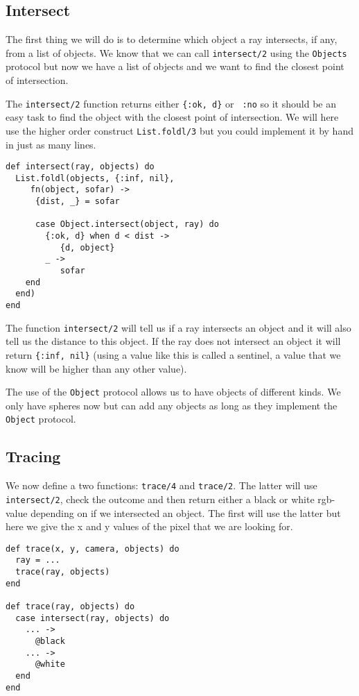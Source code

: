 \documentclass[a4paper,11pt]{article}
\begin{document}
\subsection*{Intersect}

The first thing we will do is to determine which object a ray
intersects, if any, from a list of objects. We know that we can call
{\tt intersect/2} using the {\tt Objects} protocol but now we have a list
of objects and we want to find the closest point of intersection.

The {\tt intersect/2} function returns either {\tt \{:ok, d\}} or {\tt
  :no} so it should be an easy task to find the object with the closest
point of intersection. We will here use the higher order construct
{\tt List.foldl/3} but you could implement it by hand in just as many lines.

\begin{verbatim}
def intersect(ray, objects) do
  List.foldl(objects, {:inf, nil},
     fn(object, sofar) ->
      {dist, _} = sofar

      case Object.intersect(object, ray) do
        {:ok, d} when d < dist ->
           {d, object}
        _ ->
           sofar
    end
  end)
end
\end{verbatim}

The function {\tt intersect/2} will tell us if a ray intersects an
object and it will also tell us the distance to this object. If the
ray does not intersect an object it will return {\tt \{:inf, nil\}}
(using a value like this is called a sentinel, a value that we know
will be higher than any other value).

The use of the {\tt Object} protocol allows us to have objects of
different kinds. We only have spheres now but can add any objects as
long as they implement the {\tt Object} protocol.

\subsection*{Tracing}

We now define a two functions: {\tt trace/4} and {\tt trace/2}. The
latter will use {\tt intersect/2}, check the outcome and then return
either a black or white rgb-value depending on if we intersected an
object. The first will use the latter but here we give the x and y
values of the pixel that we are looking for.

\begin{verbatim}
def trace(x, y, camera, objects) do
  ray = ...
  trace(ray, objects)
end

def trace(ray, objects) do
  case intersect(ray, objects) do
    ... ->
      @black
    ... ->
      @white
  end
end
\end{verbatim}
\end{document}
